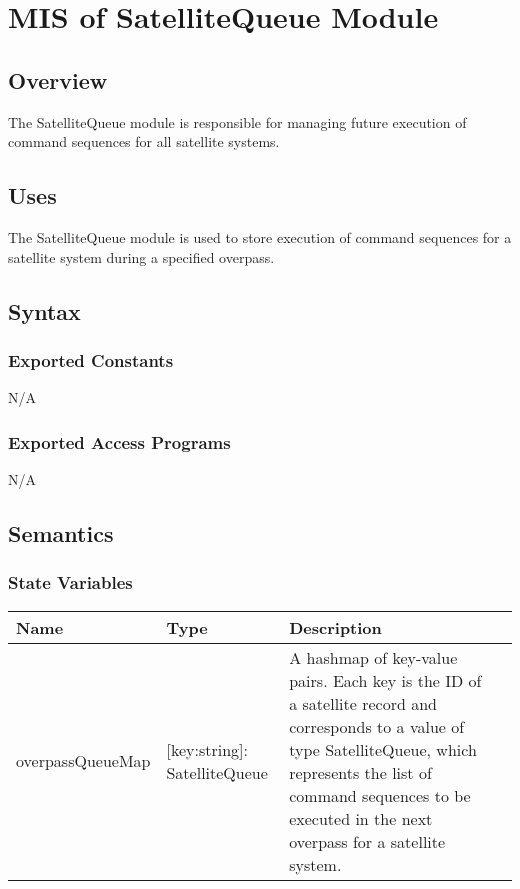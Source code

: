 \documentclass[12pt, titlepage]{article}
\begin{document}
\section{MIS of SatelliteQueue Module} \label{Module} 

\subsection{Overview}

The SatelliteQueue module is responsible for managing future execution of command sequences for all satellite systems.

\subsection{Uses}

The SatelliteQueue module is used to store execution of command sequences for a satellite system during a specified overpass.

\subsection{Syntax}

\subsubsection{Exported Constants}

N/A

\subsubsection{Exported Access Programs}

N/A

\subsection{Semantics}

\subsubsection{State Variables}

\begin{center}
\begin{tabular}{|p{4.8cm} |p{3cm} |p{5cm} |p{4cm}|}
\hline
\textbf{Name} & \textbf{Type} & \textbf{Description} \\
\hline
overpassQueueMap & { [key:string]:
   SatelliteQueue } & A hashmap of key-value pairs. Each key is the ID of a satellite record and corresponds to a value of type SatelliteQueue, which represents the list of command sequences to be executed in the next overpass for a satellite system.\\
\hline

\end{tabular}

\end{center}
\end{document}
